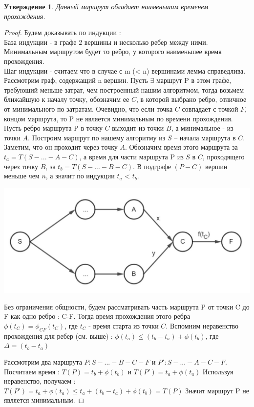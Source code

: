 \documentclass[12pt, a4paper]{article}
\newtheorem{lemma}{Утверждение}[section]
\begin{document}
\begin{lemma}
Данный маршрут обладает наименьшим временем прохождения.
\end{lemma}

\begin{proof}

Будем доказывать по индукции :\\
База индукции - в графе 2 вершины и несколько ребер между ними. Минимальным маршрутом будет то ребро, у которого наименьшее время прохождения.\\
Шаг индукции - считаем что в случае с m (< n) вершинами лемма справедлива. Рассмотрим граф, содержащий n вершин. Пусть $\exists$ маршрут P в этом графе, требующий меньше затрат, чем построенный нашим алгоритмом, тогда возьмем ближайшую к началу точку, обозначим ее $C$, в которой выбрано ребро, отличное от минимального по затратам. Очевидно, что если точка $C$ совпадает с точкой $F$, концом маршрута, то P не является минимальным по времени прохождения. \\
Пусть ребро маршрута P в точку $C$ выходит из точки $B$, а минимальное - из точки $A$. Построим маршрут по нашему алгоритму из $S$ -- начала маршрута в $C$. Заметим, что он проходит через точку $A$. Обозначим время этого маршрута за $t_a = T(S-...-A-C)$, а время для части маршрута P из $S$ в $C$, проходящего через точку $B$, за $t_b = T(S-...-B-C)$. В подграфе $(P-C)$ вершин меньше чем $n$, а значит по индукции $t_a$ < $t_b$. 
\begin{center}
	\includegraphics[scale=0.3]{graph_1.jpg}
\end{center}

Без ограничения общности, будем рассматривать часть маршрута P от точки C до F как одно ребро : C-F. Тогда время прохождения этого ребра $\phi(t_C) = \phi_{CF}(t_C)$, где $t_C$ - время старта из точки $C$. Вспомним неравенство прохождения для ребер (см. выше) : $\phi(t_a) \le (t_b - t_a) + \phi(t_b)$, где $\Delta = (t_b - t_a)$

Рассмотрим два маршрута $P : S-...-B-C-F$ и $P': S-...-A-C-F$.
Посчитаем время : $T(P) = t_b + \phi(t_b)$  и $T(P') = t_a + \phi(t_a)$
Используя неравенство, получаем : $T(P') = t_a + \phi(t_a) \le t_a + (t_b - t_a) + \phi(t_b) = T(P)$ Значит маршрут P не является минимальным.

\end{proof}
\end{document}
